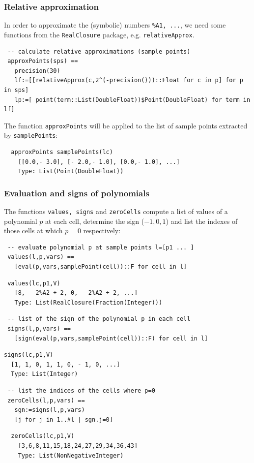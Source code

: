 \documentclass[12pt,a4paper]{article}
\begin{document}
\subsubsection{Relative approximation}
In order to approximate the (symbolic) numbers {\tt \%A1, ...}, we need some
functions from the {\tt RealClosure} package, e.g. {\tt relativeApprox}.
%
\begin{lstlisting}
 -- calculate relative approximations (sample points)
 approxPoints(sps) ==
   precision(30)
   lf:=[[relativeApprox(c,2^(-precision()))::Float for c in p] for p in sps]
   lp:=[ point(term::List(DoubleFloat))$Point(DoubleFloat) for term in lf]
\end{lstlisting}
%
The function {\tt approxPoints} will be applied to the list of sample points
extracted by {\tt samplePoints}:
%
\begin{verbatim}
  approxPoints samplePoints(lc)
    [[0.0,- 3.0], [- 2.0,- 1.0], [0.0,- 1.0], ...]
    Type: List(Point(DoubleFloat))
\end{verbatim}
% 
\subsubsection{Evaluation and signs of polynomials}
The functions {\tt values, signs} and {\tt zeroCells} compute a list of values
of a polynomial $p$ at each cell, determine the sign ($-1,0,1$) and list the
indexes of those cells at which $p=0$ respectively:
%
\begin{lstlisting}  
 -- evaluate polynomial p at sample points l=[p1 ... ]
 values(l,p,vars) == 
   [eval(p,vars,samplePoint(cell))::F for cell in l]
\end{lstlisting} 
%
\begin{verbatim}
 values(lc,p1,V)
   [8, - 2%A2 + 2, 0, - 2%A2 + 2, ...]     
   Type: List(RealClosure(Fraction(Integer)))      
\end{verbatim}
%
\begin{lstlisting} 
 -- list of the sign of the polynomial p in each cell
 signs(l,p,vars) == 
   [sign(eval(p,vars,samplePoint(cell))::F) for cell in l]
\end{lstlisting}
%
\begin{verbatim}
signs(lc,p1,V)
  [1, 1, 0, 1, 1, 0, - 1, 0, ...]
  Type: List(Integer)
\end{verbatim}
%
\begin{lstlisting}  
 -- list the indices of the cells where p=0
 zeroCells(l,p,vars) == 
   sgn:=signs(l,p,vars)
   [j for j in 1..#l | sgn.j=0]
\end{lstlisting}
%
\begin{verbatim}
  zeroCells(lc,p1,V)
    [3,6,8,11,15,18,24,27,29,34,36,43]
    Type: List(NonNegativeInteger)
\end{verbatim} 
%
\end{document}
